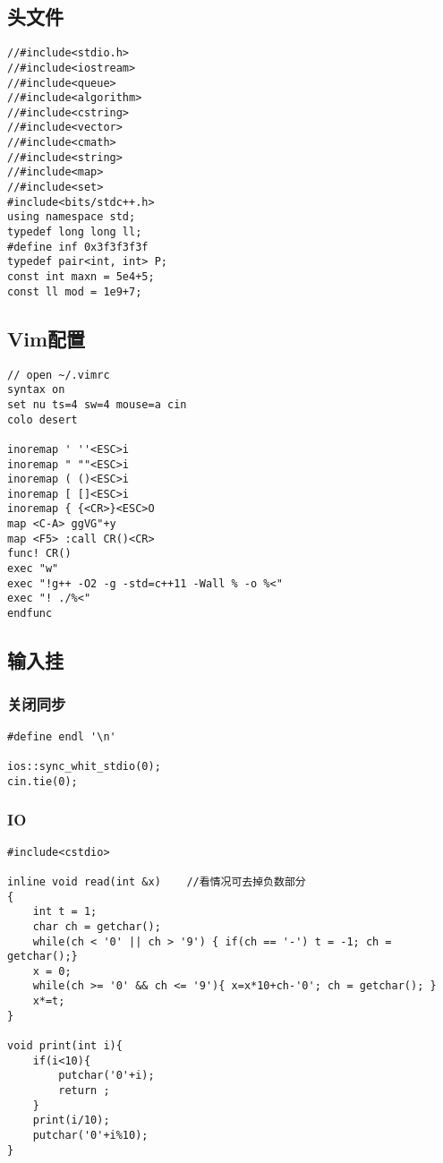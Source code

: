 \subsection{头文件}
\begin{lstlisting}
//#include<stdio.h>
//#include<iostream>
//#include<queue>
//#include<algorithm>
//#include<cstring>
//#include<vector>
//#include<cmath>
//#include<string>
//#include<map>
//#include<set>
#include<bits/stdc++.h>
using namespace std;
typedef long long ll;
#define inf 0x3f3f3f3f
typedef pair<int, int> P;
const int maxn = 5e4+5;
const ll mod = 1e9+7;
\end{lstlisting}

\subsection{Vim配置}
\begin{lstlisting}
// open ~/.vimrc
syntax on
set nu ts=4 sw=4 mouse=a cin
colo desert

inoremap ' ''<ESC>i
inoremap " ""<ESC>i
inoremap ( ()<ESC>i
inoremap [ []<ESC>i
inoremap { {<CR>}<ESC>O
map <C-A> ggVG"+y
map <F5> :call CR()<CR>
func! CR()
exec "w"
exec "!g++ -O2 -g -std=c++11 -Wall % -o %<"
exec "! ./%<"   
endfunc
\end{lstlisting}

\subsection{输入挂}
\subsubsection{关闭同步}
\begin{lstlisting}
#define endl '\n'

ios::sync_whit_stdio(0);
cin.tie(0);
\end{lstlisting}

\subsubsection{IO}
\begin{lstlisting}
#include<cstdio>

inline void read(int &x) 	//看情况可去掉负数部分
{
	int t = 1;
	char ch = getchar();
	while(ch < '0' || ch > '9') { if(ch == '-') t = -1; ch = getchar();}
	x = 0;
	while(ch >= '0' && ch <= '9'){ x=x*10+ch-'0'; ch = getchar(); } 
	x*=t;
}

void print(int i){
	if(i<10){
		putchar('0'+i);
		return ;
	}
	print(i/10);
	putchar('0'+i%10);
}
\end{lstlisting}

